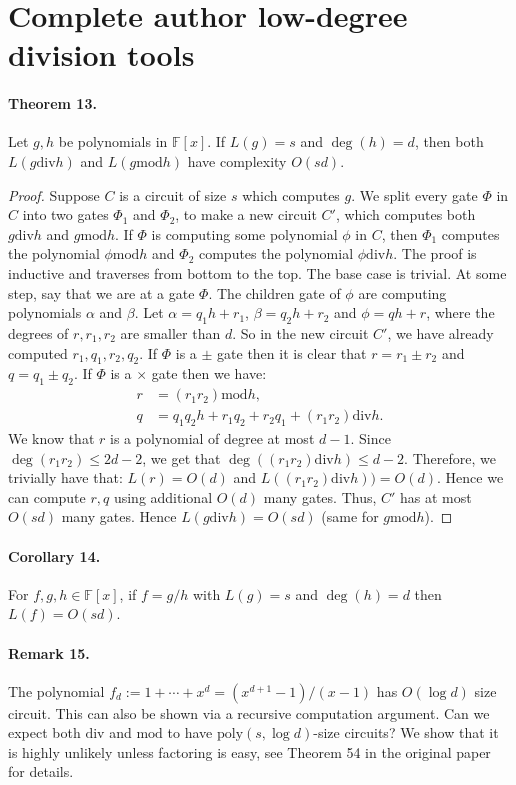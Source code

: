 \section*{Complete author low-degree division tools}
\paragraph{Theorem 13.} Let $g,h$ be polynomials in $\mathbb F[x]$. If $L(g)=s$ and $\deg(h)=d$, then both $L(g\mathbin{\mathrm{div}}h)$ and $L(g\mathbin{\mathrm{mod}}h)$ have complexity $O(sd)$.
\begin{proof}Suppose $C$ is a circuit of size $s$ which computes $g$. We split every gate $\Phi$ in $C$ into two gates $\Phi_1$ and $\Phi_2$, to make a new circuit $C'$, which computes both $g\mathbin{\mathrm{div}}h$ and $g\mathbin{\mathrm{mod}}h$. If $\Phi$ is computing some polynomial $\phi$ in $C$, then $\Phi_1$ computes the polynomial $\phi\mathbin{\mathrm{mod}}h$ and $\Phi_2$ computes the polynomial $\phi\mathbin{\mathrm{div}}h$.
The proof is inductive and traverses from bottom to the top. The base case is trivial. At some step, say that we are at a gate $\Phi$. The children gate of $\phi$ are computing polynomials $\alpha$ and $\beta$. Let $\alpha=q_1h+r_1$, $\beta=q_2h+r_2$ and $\phi=qh+r$, where the degrees of $r,r_1,r_2$ are smaller than $d$. So in the new circuit $C'$, we have already computed $r_1,q_1,r_2,q_2$. If $\Phi$ is a $\pm$ gate then it is clear that $r=r_1\pm r_2$ and $q=q_1\pm q_2$. If $\Phi$ is a $\times$ gate then we have:
\begin{align*}r&=(r_1r_2)\mathbin{\mathrm{mod}}h,\\q&=q_1q_2h+r_1q_2+r_2q_1+(r_1r_2)\mathbin{\mathrm{div}}h.\end{align*}
We know that $r$ is a polynomial of degree at most $d-1$. Since $\deg(r_1r_2)\le2d-2$, we get that $\deg((r_1r_2)\mathbin{\mathrm{div}}h)\le d-2$. Therefore, we trivially have that: $L(r)=O(d)$ and $L((r_1r_2)\mathbin{\mathrm{div}}h))=O(d)$. Hence we can compute $r,q$ using additional $O(d)$ many gates. Thus, $C'$ has at most $O(sd)$ many gates. Hence $L(g\mathbin{\mathrm{div}}h)=O(sd)$ (same for $g\mathbin{\mathrm{mod}}h$).\end{proof}
\paragraph{Corollary 14.} For $f,g,h\in\mathbb F[x]$, if $f=g/h$ with $L(g)=s$ and $\deg(h)=d$ then $L(f)=O(sd)$.
\paragraph{Remark 15.} The polynomial $f_d:=1+\cdots+x^d=(x^{d+1}-1)/(x-1)$ has $O(\log d)$ size circuit. This can also be shown via a recursive computation argument. Can we expect both $\mathrm{div}$ and $\mathrm{mod}$ to have $\mathrm{poly}(s,\log d)$-size circuits? We show that it is highly unlikely unless factoring is easy, see Theorem 54 in the original paper for details.
